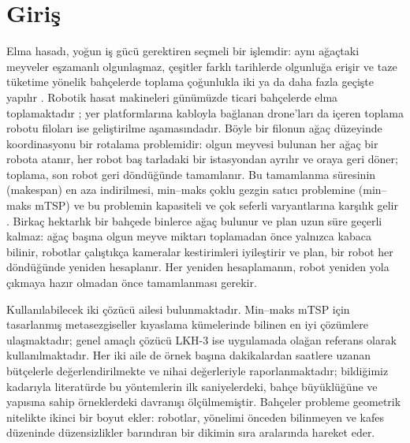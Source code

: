 \section{Giriş}\label{sec:intro}

Elma hasadı, yoğun iş gücü gerektiren seçmeli bir işlemdir: aynı ağaçtaki meyveler eşzamanlı olgunlaşmaz,
çeşitler farklı tarihlerde olgunluğa erişir ve taze tüketime yönelik bahçelerde toplama çoğunlukla
iki ya da daha fazla geçişte yapılır \citep{simnitt_2023_advancements,hall_2001_effect}. Robotik
hasat makineleri günümüzde ticari bahçelerde elma toplamaktadır \citep{silwal_2017_design,
zhang_2024_automated}; yer platformlarına kabloyla bağlanan drone'ları da içeren toplama robotu
filoları \citep{oitzman_2021_tevel} ise geliştirilme aşamasındadır. Böyle bir filonun ağaç düzeyinde
koordinasyonu bir rotalama problemidir: olgun meyvesi bulunan her ağaç bir robota
atanır, her robot baş tarladaki bir istasyondan ayrılır ve oraya geri döner;
toplama, son robot geri döndüğünde tamamlanır. Bu tamamlanma süresinin (makespan) en aza indirilmesi,
min--maks çoklu gezgin satıcı problemine (min--maks mTSP) ve bu problemin
kapasiteli ve çok seferli varyantlarına karşılık gelir \citep{bektas2006,bochtis2009}. Birkaç
hektarlık bir bahçede binlerce ağaç bulunur ve plan uzun süre geçerli kalmaz: ağaç başına
olgun meyve miktarı toplamadan önce yalnızca kabaca bilinir, robotlar çalıştıkça kameralar
kestirimleri iyileştirir ve plan, bir robot her döndüğünde yeniden hesaplanır.
Her yeniden hesaplamanın, robot yeniden yola çıkmaya hazır olmadan önce tamamlanması gerekir.

Kullanılabilecek iki çözücü ailesi bulunmaktadır. Min--maks mTSP için tasarlanmış
metasezgiseller \citep{hehao2022,hehao2023,hehaoxia2024,zheng2022,mahmoudinazlou2024} kıyaslama
kümelerinde bilinen en iyi çözümlere ulaşmaktadır; genel amaçlı çözücü
LKH-3 \citep{helsgaun2017} ise uygulamada olağan referans olarak kullanılmaktadır. Her iki aile de
örnek başına dakikalardan saatlere uzanan bütçelerle değerlendirilmekte ve nihai değerleriyle raporlanmaktadır;
bildiğimiz kadarıyla literatürde bu yöntemlerin ilk saniyelerdeki, bahçe büyüklüğüne ve yapısına sahip örneklerdeki
davranışı ölçülmemiştir. Bahçeler probleme geometrik nitelikte ikinci bir boyut ekler:
robotlar, yönelimi önceden bilinmeyen ve kafes düzeninde düzensizlikler barındıran bir dikimin
sıra aralarında hareket eder.

